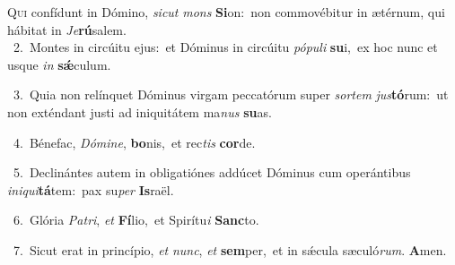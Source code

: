 \lettrine{\initial\textcolor{\initialcolor}{Q}}{ui} confídunt in Dómino, \textit{sic}\-\textit{ut} \textit{mons} \textbf{Si}\-on:~\star non commovébitur in ætérnum, qui hábitat in \textit{Je}\-\textbf{rú}salem.\\
{\numbfont\textcolor{\numbcolor}{~2.}}~Montes in circúitu ejus:~\dagger et Dóminus in circúitu \textit{pó}\-\textit{pu}\textit{li} \textbf{su}\-i,~\star ex hoc nunc et usque \textit{in} \textbf{sǽ}\-culum.\par
{\numbfont\textcolor{\numbcolor}{~3.}}~Quia non relínquet Dóminus virgam peccatórum super \textit{sor}\-\textit{tem} \textit{jus}\-\textbf{tó}rum:~\star ut non exténdant justi ad iniquitátem ma\textit{nus} \textbf{su}\-as.\par
{\numbfont\textcolor{\numbcolor}{~4.}}~Bénefac, \textit{Dó}\-\textit{mi}\textit{ne}, \textbf{bo}\-nis,~\star et rec\textit{tis} \textbf{cor}\-de.\par
{\numbfont\textcolor{\numbcolor}{~5.}}~Declinántes autem in obligatiónes addúcet Dóminus cum operántibus \textit{in}\-\textit{i}\textit{qui}\textbf{tá}tem:~\star pax su\textit{per} \textbf{Is}\-raël.\par
{\numbfont\textcolor{\numbcolor}{~6.}}~Glória \textit{Pa}\-\textit{tri}, \textit{et} \textbf{Fí}\-lio,~\star et Spirítu\textit{i} \textbf{Sanc}\-to.\par
{\numbfont\textcolor{\numbcolor}{~7.}}~Sicut erat in princípio, \textit{et} \textit{nunc}\-, \textit{et} \textbf{sem}\-per,~\star et in sǽcula sæculó\-\textit{rum}\-. \textbf{A}\-men.\par
